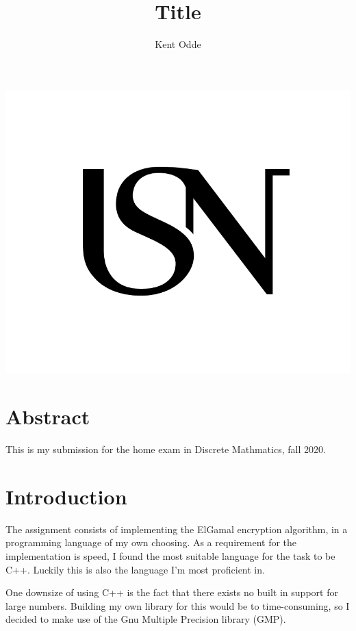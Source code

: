 \documentclass{article}
\begin{document}
\author{Kent Odde}
\title{Title}

\maketitle
\thispagestyle{empty}
\begin{center}
\includegraphics[width=\linewidth,height=0.2\textheight,keepaspectratio]{img/USN.png}
\end{center}
\newpage

\tableofcontents

\newpage

\section{Abstract}
This is my submission for the home exam in Discrete Mathmatics, fall 2020.



\section{Introduction}
The assignment consists of implementing the ElGamal encryption algorithm, in a programming language of my own choosing. As a requirement for the implementation is speed, I found the most suitable language for the task to be C++. Luckily this is also the language I'm most proficient in.

One downsize of using C++ is the fact that there exists no built in support for large numbers. Building my own library for this would be to time-consuming, so I decided to make use of the Gnu Multiple Precision library (GMP)\cite{GMP}.
\end{document}
